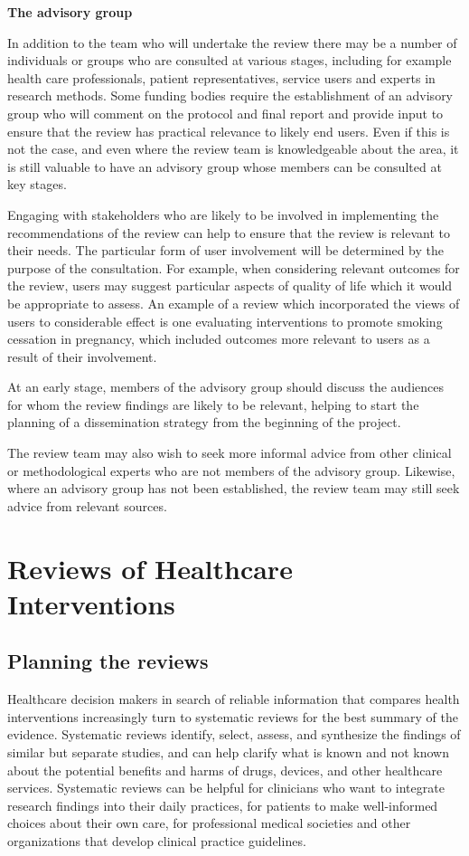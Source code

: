 \documentclass[
  10pt,
  a4paper,
  DIV=11,
  numbers=noendperiod]{scrreprt}
\begin{document}
\textbf{The advisory group}

In addition to the team who will undertake the review there may be a
number of individuals or groups who are consulted at various stages,
including for example health care professionals, patient
representatives, service users and experts in research methods. Some
funding bodies require the establishment of an advisory group who will
comment on the protocol and final report and provide input to ensure
that the review has practical relevance to likely end users. Even if
this is not the case, and even where the review team is knowledgeable
about the area, it is still valuable to have an advisory group whose
members can be consulted at key stages.

Engaging with stakeholders who are likely to be involved in implementing
the recommendations of the review can help to ensure that the review is
relevant to their needs. The particular form of user involvement will be
determined by the purpose of the consultation. For example, when
considering relevant outcomes for the review, users may suggest
particular aspects of quality of life which it would be appropriate to
assess. An example of a review which incorporated the views of users to
considerable effect is one evaluating interventions to promote smoking
cessation in pregnancy, which included outcomes more relevant to users
as a result of their involvement.

At an early stage, members of the advisory group should discuss the
audiences for whom the review findings are likely to be relevant,
helping to start the planning of a dissemination strategy from the
beginning of the project.

The review team may also wish to seek more informal advice from other
clinical or methodological experts who are not members of the advisory
group. Likewise, where an advisory group has not been established, the
review team may still seek advice from relevant sources.

\part{Reviews of Healthcare Interventions}

\chapter{Planning the
reviews}\label{sec-planning-systematic-reviews-of-interventions}

Healthcare decision makers in search of reliable information that
compares health interventions increasingly turn to systematic reviews
for the best summary of the evidence. Systematic reviews identify,
select, assess, and synthesize the findings of similar but separate
studies, and can help clarify what is known and not known about the
potential benefits and harms of drugs, devices, and other healthcare
services. Systematic reviews can be helpful for clinicians who want to
integrate research findings into their daily practices, for patients to
make well-informed choices about their own care, for professional
medical societies and other organizations that develop clinical practice
guidelines.
\end{document}
